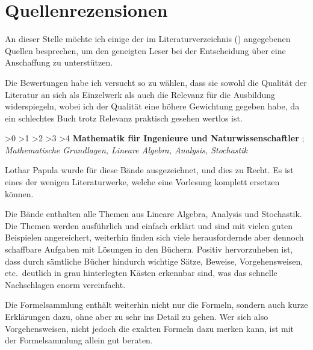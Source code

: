 \documentclass[english,ngerman,fontsize=9pt,intoc,index=totoc,refpage,listof=totoc,draft]{scrbook}
\makeatletter
\numberwithin{equation}{section}
\let\oldcleardoublepage\cleardoublepage
\let\cleardoublepage\clearpage
\renewcommand{\part}{%
  \if@openright
    \oldcleardoublepage
  \else
    \clearpage
  \fi
  \thispagestyle{empty}%
  \if@twocolumn
    \onecolumn
    \@tempswatrue
  \else
    \@tempswafalse
  \fi
  \null\vfil
  \secdef\@part\@spart}
\newcommand{\ratingstar}{{\footnotesize \FiveStarShadow}}
\newcommand{\rating}[4]{\noindent\begin{flushright}
  \null\hfilneg%
  \ifnum #1>0 \ratingstar \fi
  \ifnum #1>1 \ratingstar \fi
  \ifnum #1>2 \ratingstar \fi
  \ifnum #1>3 \ratingstar \fi
  \ifnum #1>4 \ratingstar \fi
  \hspace{0.6667em}
  \textbf{\sffamily #2 \hfil\mbox{}}%
  \hspace{0.6667em}
  \cite{#3}; \emph{#4}
\end{flushright}}
\makeatother
\begin{document}
\part{Rechnernetze}
\parttoc

\fi

\appendix

\part{Anhang}

\chapter{Quellenrezensionen}

An dieser Stelle möchte ich einige der im Literaturverzeichnis () angegebenen Quellen besprechen, um den geneigten Leser bei der Entscheidung über eine Anschaffung zu unterstützen.

Die Bewertungen habe ich versucht so zu wählen, dass sie sowohl die Qualität der Literatur an sich als Einzelwerk als auch die Relevanz für die Ausbildung widerspiegeln, wobei ich der Qualität eine höhere Gewichtung gegeben habe, da ein schlechtes Buch trotz Relevanz praktisch gesehen wertlos ist.


\rating{5}{Mathematik für Ingenieure und Naturwissenschaftler}
{Papula1,Papula2,Papula3,PapulaFS}
{Mathematische Grundlagen, Lineare Algebra, Analysis, Stochastik}

Lothar Papula wurde für diese Bände ausgezeichnet, und dies zu Recht.
Es ist eines der wenigen Literaturwerke, welche eine Vorlesung komplett ersetzen können.

Die Bände enthalten alle Themen aus Lineare Algebra, Analysis und Stoch\-as\-tik.
Die Themen werden ausführlich und einfach erklärt und sind mit vielen guten Beispielen angereichert, weiterhin finden sich viele herausfordernde aber dennoch schaffbare Aufgaben mit Lösungen in den Büchern.
Positiv hervorzuheben ist, dass durch sämtliche Bücher hindurch wichtige Sätze, Beweise, Vorgehensweisen, etc.~deutlich in grau hinterlegten Kästen erkennbar sind, was das schnelle Nachschlagen enorm vereinfacht.

Die Formelsammlung enthält weiterhin nicht nur die Formeln, sondern auch kurze Erklärungen dazu, ohne aber zu sehr ins Detail zu gehen.
Wer sich also Vorgehensweisen, nicht jedoch die exakten Formeln dazu merken kann, ist mit der Formelsammlung allein gut beraten.
\end{document}
